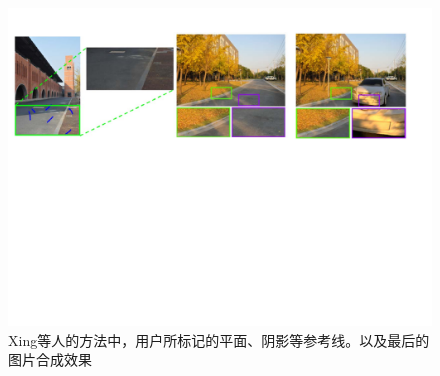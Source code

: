\begin{figure}[!htbp]
    \centering
    \includegraphics[width=1.0\textwidth]{Img/user-aux.pdf}

    \caption[用户标记辅助估计光照]
    {Xing等人\cite{xing2013lighting}的方法中，用户所标记的平面、阴影等参考线。以及最后的图片合成效果}
    
    \label{fig:user-aux}
\end{figure}